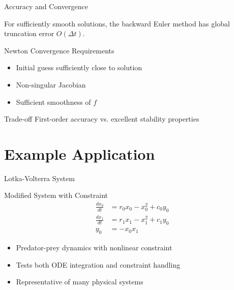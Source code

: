 \documentclass[10pt]{beamer}
\begin{document}
\begin{frame}{Accuracy and Convergence}
\begin{theorem}
For sufficiently smooth solutions, the backward Euler method has global truncation error $O(\Delta t)$.
\end{theorem}

\begin{block}{Newton Convergence Requirements}
\begin{itemize}
\item Initial guess sufficiently close to solution
\item Non-singular Jacobian
\item Sufficient smoothness of $f$
\end{itemize}
\end{block}

\pause
\begin{alertblock}{Trade-off}
First-order accuracy vs. excellent stability properties
\end{alertblock}
\end{frame}

\section{Example Application}

\begin{frame}{Lotka-Volterra System}
\begin{block}{Modified System with Constraint}
\begin{align}
\frac{dx_0}{dt} &= r_0 x_0 - x_0^2 + c_0 y_0 \\
\frac{dx_1}{dt} &= r_1 x_1 - x_1^2 + c_1 y_0 \\
y_0 &= -x_0 x_1
\end{align}
\end{block}

\begin{itemize}
\item Predator-prey dynamics with nonlinear constraint
\item Tests both ODE integration and constraint handling
\item Representative of many physical systems
\end{itemize}
\end{frame}
\end{document}
